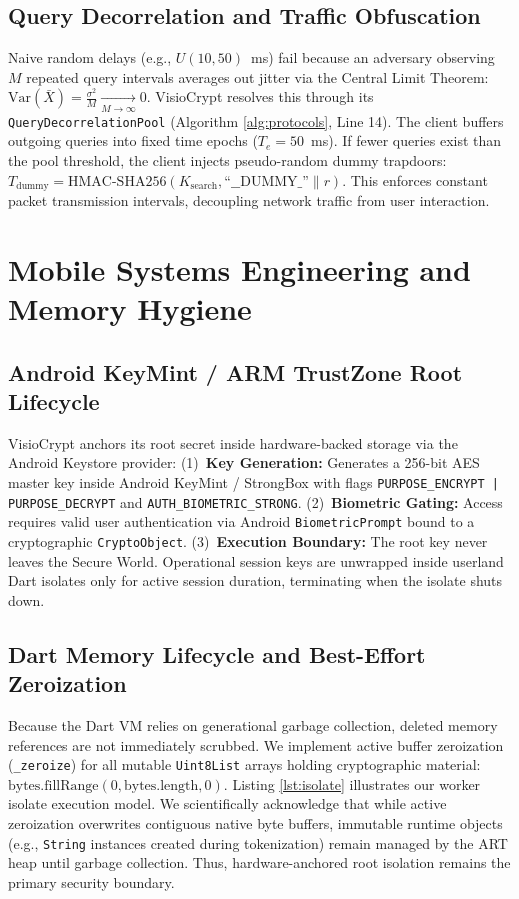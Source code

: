 \documentclass[10pt,conference]{IEEEtran}
\begin{document}
\subsection{Query Decorrelation and Traffic Obfuscation}
Naive random delays (e.g., $U(10, 50)$~ms) fail because an adversary observing $M$ repeated query intervals averages out jitter via the Central Limit Theorem: $\text{Var}(\bar{X}) = \frac{\sigma^2}{M} \xrightarrow[M \to \infty]{} 0$. VisioCrypt resolves this through its \texttt{QueryDecorrelationPool} (Algorithm \ref{alg:protocols}, Line 14). The client buffers outgoing queries into fixed time epochs ($T_e = 50$~ms). If fewer queries exist than the pool threshold, the client injects pseudo-random dummy trapdoors: $T_{\text{dummy}} = \text{HMAC-SHA256}(K_{\text{search}}, \text{``\_\_DUMMY\_''}\parallel r)$. This enforces constant packet transmission intervals, decoupling network traffic from user interaction.

\section{Mobile Systems Engineering and Memory Hygiene}
\subsection{Android KeyMint / ARM TrustZone Root Lifecycle}
VisioCrypt anchors its root secret inside hardware-backed storage via the Android Keystore provider: (1)~\textbf{Key Generation:} Generates a 256-bit AES master key inside Android KeyMint / StrongBox with flags \texttt{PURPOSE\_ENCRYPT | PURPOSE\_DECRYPT} and \texttt{AUTH\_BIOMETRIC\_STRONG}. (2)~\textbf{Biometric Gating:} Access requires valid user authentication via Android \texttt{BiometricPrompt} bound to a cryptographic \texttt{CryptoObject}. (3)~\textbf{Execution Boundary:} The root key never leaves the Secure World. Operational session keys are unwrapped inside userland Dart isolates only for active session duration, terminating when the isolate shuts down.

\subsection{Dart Memory Lifecycle and Best-Effort Zeroization}
Because the Dart VM relies on generational garbage collection, deleted memory references are not immediately scrubbed. We implement active buffer zeroization (\texttt{\_zeroize}) for all mutable \texttt{Uint8List} arrays holding cryptographic material: $\text{bytes.fillRange}(0, \text{bytes.length}, 0)$. Listing \ref{lst:isolate} illustrates our worker isolate execution model. We scientifically acknowledge that while active zeroization overwrites contiguous native byte buffers, immutable runtime objects (e.g., \texttt{String} instances created during tokenization) remain managed by the ART heap until garbage collection. Thus, hardware-anchored root isolation remains the primary security boundary.
\end{document}

